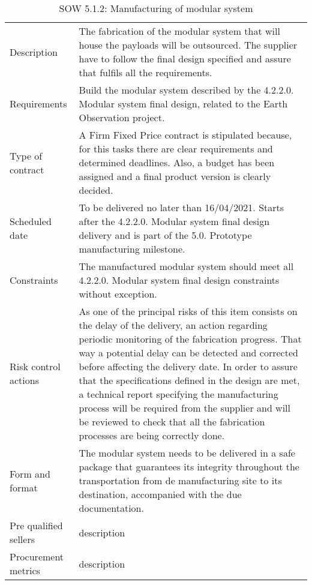 \begin{table}[H]
	\centering
	\begin{tabular}
		{>{\raggedright\arraybackslash}p{3cm} >{\arraybackslash}p{11cm}}
		
		\toprule[2pt]
		
		\multicolumn{2}{c}{\textbf{SOW - 5.1.2. Manufacturing of modular system}}\\
		
		\midrule[1.5pt]
		
		Description & The fabrication of the modular system that will house the payloads will be outsourced. The supplier have to follow the final design specified and assure that fulfils all the requirements. \\
		\hline
		
		Requirements & Build the modular system described by the 4.2.2.0. Modular system final design, related to the Earth Observation project.\\
		\hline
		
		Type of contract & A Firm Fixed Price contract is stipulated because, for this tasks there are clear requirements and determined deadlines. Also, a budget has been assigned and a final product version is clearly decided.\\
		\hline
		
		Scheduled date & To be delivered no later than 16/04/2021. Starts after the 4.2.2.0. Modular system final design delivery and is part of the 5.0. Prototype manufacturing milestone.\\
		\hline
		
		Constraints & The manufactured modular system should meet all 4.2.2.0. Modular system final design constraints without exception.\\
		\hline
		
		Risk control actions & As one of the principal risks of this item consists on the delay of the delivery, an action regarding periodic monitoring of the fabrication progress. That way a potential delay can be detected and corrected before affecting the delivery date.
		In order to assure that the specifications defined in the design are met, a technical report specifying the manufacturing process will be required from the supplier and will be reviewed to check that all the fabrication processes are being correctly done.\\
		\hline
		
		Form and format & The modular system needs to be delivered in a safe package that guarantees its integrity throughout the transportation from de manufacturing site to its destination, accompanied with the due documentation.\\
		\hline
		
		Pre qualified sellers & description\\
		\hline
		
		Procurement metrics & description\\
		
		\bottomrule[2pt]		
		
	\end{tabular}
	\caption{SOW 5.1.2: Manufacturing of modular system}
\end{table}

